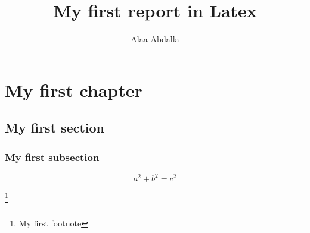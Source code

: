 \documentclass[12pt,a4paper]{report}
\author{Alaa Abdalla}
\title{My first report in Latex}
\begin{document}
\maketitle

\tableofcontents

\chapter{My first chapter}

\section{My first section}

\subsection{My first subsection}

\begin{equation}
a^2 + b^2 = c^2
\end{equation}


\footnote{My first footnote}
\end{document}
